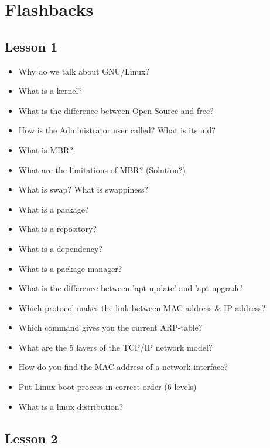\documentclass{article}
\begin{document}
\section{Flashbacks}

\subsection{Lesson 1}

\begin{itemize}
    \item Why do we talk about GNU/Linux?
    \item What is a kernel?
    \item What is the difference between Open Source and free?
    \item How is the Administrator user called? What is its uid?
    \item What is MBR?
    \item What are the limitations of MBR? (Solution?)
    \item What is swap? What is swappiness?
    \item What is a package?
    \item What is a repository?
    \item What is a dependency?
    \item What is a package manager?
    \item What is the difference between 'apt update' and 'apt upgrade'
    \item Which protocol makes the link between MAC address \& IP address?
    \item Which command gives you the current ARP-table?
    \item What are the 5 layers of the TCP/IP network model?
    \item How do you find the MAC-address of a network interface?
    \item Put Linux boot process in correct order (6 levels)
    \item What is a linux distribution?
\end{itemize}

\subsection{Lesson 2}
\end{document}
